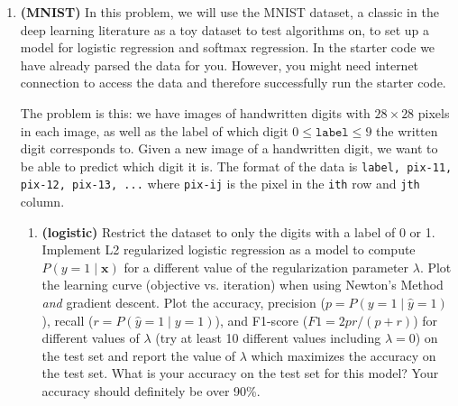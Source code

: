 \documentclass[letter,11pt]{article}
\newcommand{\xx}{\bm{x}}
\begin{document}
\begin{enumerate}
    \newpage


    \item \textbf{(MNIST)} In this problem, we will use the MNIST dataset, a
    classic in the deep learning literature as a toy dataset to test algorithms
    on, to set up a model for logistic regression and softmax regression. In the
    starter code we have already parsed the data for you. However, you might
    need internet connection to access the data and therefore successfully run
    the starter code.
    
    The problem is this: we have images of handwritten digits with $28\times 28$
    pixels in each image, as well as the label of which digit $0 \leq
    \texttt{label} \leq 9$ the written digit corresponds to. Given a new image
    of a handwritten digit, we want to be able to predict which digit it is. The
    format of the data is \texttt{label, pix-11, pix-12, pix-13, ...} where
    \texttt{pix-ij} is the pixel in the \texttt{ith} row and \texttt{jth} column.

    \begin{enumerate}[label=(\alph*)]
        \item \textbf{(logistic)} Restrict the dataset to only the digits with a
        label of 0 or 1. Implement L2 regularized logistic regression as a model
        to compute $P(y=1\mid\xx)$ for a different value of the regularization
        parameter $\lambda$. Plot the learning curve (objective vs. iteration)
        when using Newton's Method \textit{and} gradient descent. Plot the
        accuracy, precision ($p = P(y=1 \mid \hat y=1)$), recall ($r = P(\hat
        y=1 \mid y=1)$), and F1-score ($F1 = 2pr / (p+r)$) for different values of
        $\lambda$ (try at least 10 different values including $\lambda = 0$) on
        the test set and report the value of $\lambda$ which maximizes the
        accuracy on the test set. What is your accuracy on the test set for this
        model? Your accuracy should definitely be over 90\%.


\end{enumerate}
\end{enumerate}
\end{document}
